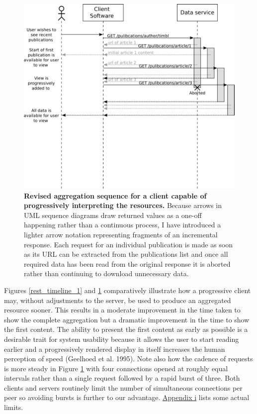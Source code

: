 \documentclass[12pt, ]{article}
\makeatletter
\def\maxwidth{\ifdim\Gin@nat@width>\linewidth\linewidth
\else\Gin@nat@width\fi}
\let\Oldincludegraphics\includegraphics
\renewcommand{\includegraphics}[1]{\Oldincludegraphics[width=\maxwidth]{#1}}
\makeatother
\begin{document}
\begin{figure}[htbp]
\centering
\includegraphics{images/rest_timeline_2.png}
\caption{\textbf{Revised aggregation sequence for a client capable of
progressively interpreting the resources.} Because arrows in UML
sequence diagrams draw returned values as a one-off happening rather
than a continuous process, I have introduced a lighter arrow notation
representing fragments of an incremental response. Each request for an
individual publication is made as soon as its URL can be extracted from
the publications list and once all required data has been read from the
original response it is aborted rather than continuing to download
unnecessary data. \label{rest_timeline_2}}
\end{figure}

Figures \ref{rest_timeline_1} and \ref{rest_timeline_2} comparatively
illustrate how a progressive client may, without adjustments to the
server, be used to produce an aggregated resource sooner. This results
in a moderate improvement in the time taken to show the complete
aggregation but a dramatic improvement in the time to show the first
content. The ability to present the first content as early as possible
is a desirable trait for system usability because it allows the user to
start reading earlier and a progressively rendered display in itself
increases the human perception of speed (Geelhoed et al. 1995). Note
also how the cadence of requests is more steady in Figure
\ref{rest_timeline_2} with four connections opened at roughly equal
intervals rather than a single request followed by a rapid burst of
three. Both clients and servers routinely limit the number of
simultaneous connections per peer so avoiding bursts is further to our
advantage. \hyperref[appendixux5fhttpux5flimits]{Appendix i} lists some
actual limits.
\end{document}
